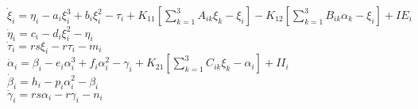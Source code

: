 \documentclass[12pt]{article}
\begin{document}
    $\displaystyle \dot{\xi}_i = \eta_i-a_i\xi_i^3+b_i\xi_i^2-\tau_i+K_{11}\left[\sum_{k=1}^{3} A_{ik}\xi_k-\xi_i\right] - K_{12}\left[\sum_{k=1}^{3} B_{ik}\alpha_k-\xi_i\right] + IE_i$
    \\
    $\displaystyle \dot{\eta}_i = c_i-d_i\xi_i^2-\eta_i$
    \\
    $\displaystyle \dot{\tau}_i = rs\xi_i-r\tau_i-m_i$
    \\
    $\displaystyle \dot{\alpha}_i = \beta_i-e_i\alpha_i^3+f_i\alpha_i^2-\gamma_i+K_{21}\left[\sum_{k=1}^{3} C_{ik}\xi_k-\alpha_i\right] + II_i$
    \\
    $\displaystyle \dot{\beta}_i = h_i-p_i\alpha_i^2-\beta_i$
    \\
    $\displaystyle \dot{\gamma}_i = rs\alpha_i-r\gamma_i-n_i$

  
\end{document}
